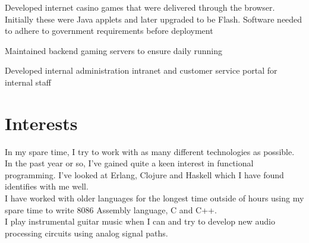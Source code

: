 \documentclass[letterpaper]{deedy-resume} %
\begin{document}
\begin{minipage}[t]{0.66\textwidth}
\sectionspace %



\begin{tightitemize}
\item Developed internet casino games that were delivered through the browser. Initially these were Java applets and later upgraded to be Flash. Software needed to adhere to government requirements before deployment
\item Maintained backend gaming servers to ensure daily running
\item Developed internal administration intranet and customer service portal for internal staff
\end{tightitemize}

\sectionspace %

\section{Interests}

In my spare time, I try to work with as many different technologies as possible. In the past year or so, I've gained quite a keen interest in functional programming. I've looked at Erlang, Clojure and Haskell which I have found identifies with me well. \\
I have worked with older languages for the longest time outside of hours using my spare time to write 8086 Assembly language, C and C++.\\
I play instrumental guitar music when I can and try to develop new audio processing circuits using analog signal paths.

\end{minipage} %




\end{document}
